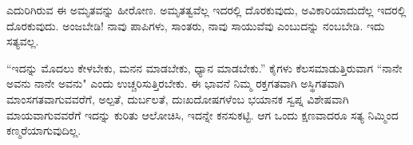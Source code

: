 ಎದುರಿಗಿರುವ ಈ ಅಮೃತವನ್ನು ಹೀರೋಣ. ಅಮೃತತ್ವವೆಲ್ಲ ಇದರಲ್ಲಿ ದೊರಕುವುದು, ಅವಿಕಾರಿಯಾದುದೆಲ್ಲ ಇದರಲ್ಲಿ ದೊರಕುವುದು. ಅಂಜಬೇಡಿ! ನಾವು ಪಾಪಿಗಳು, ಸಾಂತರು, ನಾವು ಸಾಯುವೆವು ಎಂಬುದನ್ನು ನಂಬಬೇಡಿ. ಇದು ಸತ್ಯವಲ್ಲ.

“ಇದನ್ನು ಮೊದಲು ಕೇಳಬೇಕು, ಮನನ ಮಾಡಬೇಕು, ಧ್ಯಾನ ಮಾಡಬೇಕು.'' ಕೈಗಳು ಕೆಲಸಮಾಡುತ್ತಿರುವಾಗ “ನಾನೇ ಅವನು ನಾನೇ ಅವನು" ಎಂದು ಉಚ್ಚರಿಸುತ್ತಿರಬೇಕು. ಈ ಭಾವನೆ ನಿಮ್ಮ ರಕ್ತಗತವಾಗಿ ಅಸ್ಥಿಗತವಾಗಿ ಮಾಂಸಗತವಾಗುವವರೆಗೆ, ಅಲ್ಪತೆ, ದುರ್ಬಲತೆ, ದುಃಖದೋಷಗಳೆಂಬ ಭಯಾನಕ ಸ್ವಪ್ನ ವಿಶೇಷವಾಗಿ ಮಾಯವಾಗುವವರೆಗೆ ಇದನ್ನು ಕುರಿತು ಆಲೋಚಿಸಿ, ಇದನ್ನೇ ಕನಸುಕಟ್ಟಿ. ಆಗ ಒಂದು ಕ್ಷಣವಾದರೂ ಸತ್ಯ ನಿಮ್ಮಿಂದ ಕಣ್ಮರೆಯಾಗುವುದಿಲ್ಲ.

